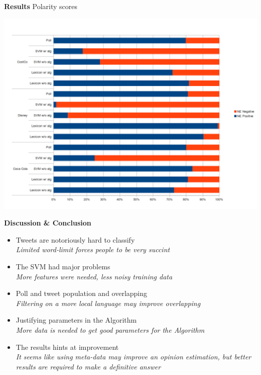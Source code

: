 \documentclass[landscape,20pt]{extarticle}
\newcommand*{\TitleFont}{\Huge \bf}
\newcommand*{\TextFont}{\normalsize \it}
\begin{document}
\clearpage
\thispagestyle{empty}

{\TitleFont Results}
\newline
\small{Polarity scores}
\newline
\centerline{\includegraphics[scale=0.7]{../img/full1.png}}




\clearpage
\thispagestyle{empty}

{\TitleFont Discussion \& Conclusion}

\begin{itemize}
\item Tweets are notoriously hard to classify\\
{\TextFont Limited word-limit forces people to be very succint}
\item The SVM had major problems\\
{\TextFont More features were needed, less noisy training data}
\item Poll and tweet population and overlapping\\
{\TextFont Filtering on a more local language may improve overlapping}
\item Justifying parameters in the Algorithm\\
{\TextFont More data is needed to get good parameters for the Algorithm}
\item The results hints at improvement\\
{\TextFont It seems like using meta-data may improve an opinion estimation, but better results are required to make a definitive answer}
\end{itemize}
\end{document}
